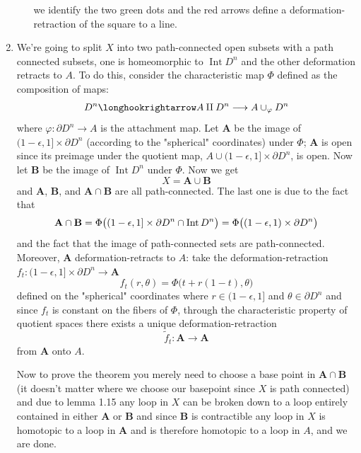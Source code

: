 \documentclass{pset}
\begin{document}
\begin{problem}
\begin{enumerate}[label=1.1.\arabic*]
\begin{enumerate}
            we identify the two green dots and the red arrows define a deformation-retraction of the square to a line.
        \end{enumerate}
        \setcounter{enumi}{17}
        \item We're going to split $X$ into two path-connected open subsets with a path connected subsets, one is homeomorphic to $\operatorname{Int} D^n$ and the other deformation retracts to $A$. To do this, consider the characteristic map $\Phi$ defined as the composition of maps:
        \[D^n \longhookrightarrow A \amalg D^n \longrightarrow A \cup_\varphi D^n\]
        where $\varphi\colon \partial D^n \to A$ is the attachment map. Let $\mathbf{A}$ be the image of $(1-\epsilon, 1] \times \partial D^n$ (according to the "spherical" coordinates) under $\Phi$; $\mathbf{A}$ is open since its preimage under the quotient map, $A \cup (1-\epsilon, 1] \times \partial D^n$, is open. Now let $\mathbf{B}$ be the image of $\operatorname{Int} D^n$ under $\Phi$. Now we get
        \[X = \mathbf{A} \cup \mathbf{B}\]
        and $\mathbf{A}$, $\mathbf{B}$, and $\mathbf{A \cap B}$ are all path-connected. The last one is due to the fact that
        \[\mathbf{A \cap B} = \Phi\big((1-\epsilon, 1] \times \partial D^n \cap \operatorname{Int} D^n \big) = \Phi\big((1-\epsilon, 1) \times \partial D^n \big)\]
        and the fact that the image of path-connected sets are path-connected. Moreover, $\mathbf{A}$ deformation-retracts to $A$: take the deformation-retraction $f_t\colon (1-\epsilon, 1] \times \partial D^n \to \mathbf{A}$ 
        \[f_t(r, \theta) = \Phi\big(t+r(1-t), \theta\big)\]
        defined on the "spherical" coordinates where $r\in (1-\epsilon, 1]$ and $\theta\in\partial D^n$ and since $f_t$ is constant on the fibers of $\Phi$, through the characteristic property of quotient spaces there exists a unique deformation-retraction
        \[\tilde{f}_t\colon \mathbf{A \longrightarrow A}\]
        from $\mathbf{A}$ onto $A$.
        
        Now to prove the theorem you merely need to choose a base point in $\mathbf{A \cap B}$ (it doesn't matter where we choose our basepoint since $X$ is path connected) and due to lemma 1.15 any loop in $X$ can be broken down to a loop entirely contained in either $\mathbf{A}$ or $\mathbf{B}$ and since $\mathbf{B}$ is contractible any loop in $X$ is homotopic to a loop in $\mathbf{A}$ and is therefore homotopic to a loop in $A$, and we are done.


\end{enumerate}
\end{problem}
\end{document}
